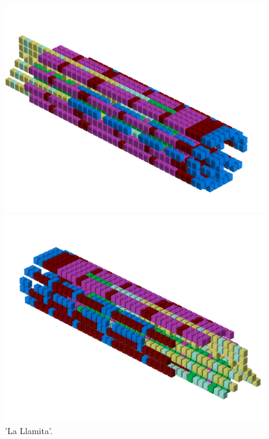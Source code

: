 \begin{figure}[H]
    \centering
    \begin{adjustbox}{width=12cm,center}
      \includegraphics[width=12cm]{src/patterns/pattern8-45.png}%
    \end{adjustbox}
    \begin{adjustbox}{width=12cm,margin=0cm -4cm}
      \includegraphics[width=12cm]{src/patterns/pattern8-225.png}%
    \end{adjustbox}
\caption{'La Llamita'.}
\end{figure}
\clearpage

